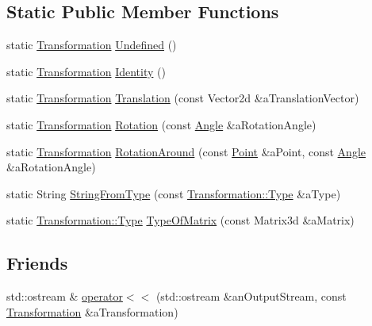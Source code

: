 \subsection*{Static Public Member Functions}
\begin{DoxyCompactItemize}
\item 
static \hyperlink{classostk_1_1math_1_1geom_1_1d2_1_1_transformation}{Transformation} \hyperlink{classostk_1_1math_1_1geom_1_1d2_1_1_transformation_a55457472768446de4806b6033ec15b73}{Undefined} ()
\item 
static \hyperlink{classostk_1_1math_1_1geom_1_1d2_1_1_transformation}{Transformation} \hyperlink{classostk_1_1math_1_1geom_1_1d2_1_1_transformation_a7d2ed6f35bb28c7a1d2b1e54672e0109}{Identity} ()
\item 
static \hyperlink{classostk_1_1math_1_1geom_1_1d2_1_1_transformation}{Transformation} \hyperlink{classostk_1_1math_1_1geom_1_1d2_1_1_transformation_aa8b8907c98ee5704c3356324c6c83f2b}{Translation} (const Vector2d \&a\+Translation\+Vector)
\item 
static \hyperlink{classostk_1_1math_1_1geom_1_1d2_1_1_transformation}{Transformation} \hyperlink{classostk_1_1math_1_1geom_1_1d2_1_1_transformation_a39b9e360f8799a1770b55cc7f68a1db6}{Rotation} (const \hyperlink{classostk_1_1math_1_1geom_1_1_angle}{Angle} \&a\+Rotation\+Angle)
\item 
static \hyperlink{classostk_1_1math_1_1geom_1_1d2_1_1_transformation}{Transformation} \hyperlink{classostk_1_1math_1_1geom_1_1d2_1_1_transformation_a6a23b51b7b0b20c474cc6a94e2ebb8c5}{Rotation\+Around} (const \hyperlink{classostk_1_1math_1_1geom_1_1d2_1_1objects_1_1_point}{Point} \&a\+Point, const \hyperlink{classostk_1_1math_1_1geom_1_1_angle}{Angle} \&a\+Rotation\+Angle)
\item 
static String \hyperlink{classostk_1_1math_1_1geom_1_1d2_1_1_transformation_a713fb496f41bcc03bdd881a438958fea}{String\+From\+Type} (const \hyperlink{classostk_1_1math_1_1geom_1_1d2_1_1_transformation_ad98045429a325b64040ef419cb68bea9}{Transformation\+::\+Type} \&a\+Type)
\item 
static \hyperlink{classostk_1_1math_1_1geom_1_1d2_1_1_transformation_ad98045429a325b64040ef419cb68bea9}{Transformation\+::\+Type} \hyperlink{classostk_1_1math_1_1geom_1_1d2_1_1_transformation_a44941f94239e03e1ee17bced99cbf48c}{Type\+Of\+Matrix} (const Matrix3d \&a\+Matrix)
\end{DoxyCompactItemize}
\subsection*{Friends}
\begin{DoxyCompactItemize}
\item 
std\+::ostream \& \hyperlink{classostk_1_1math_1_1geom_1_1d2_1_1_transformation_afb2829e106dc4aeab1c706d1eaa357e8}{operator$<$$<$} (std\+::ostream \&an\+Output\+Stream, const \hyperlink{classostk_1_1math_1_1geom_1_1d2_1_1_transformation}{Transformation} \&a\+Transformation)
\end{DoxyCompactItemize}


